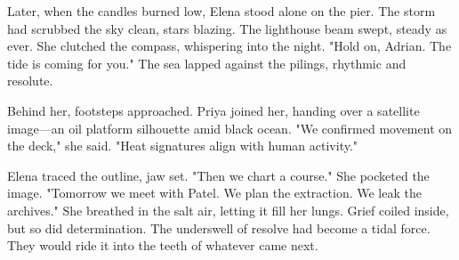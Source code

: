 Later, when the candles burned low, Elena stood alone on the pier. The storm had scrubbed the sky clean, stars blazing. The lighthouse beam swept, steady as ever. She clutched the compass, whispering into the night. "Hold on, Adrian. The tide is coming for you." The sea lapped against the pilings, rhythmic and resolute.

Behind her, footsteps approached. Priya joined her, handing over a satellite image—an oil platform silhouette amid black ocean. "We confirmed movement on the deck," she said. "Heat signatures align with human activity."

Elena traced the outline, jaw set. "Then we chart a course." She pocketed the image. "Tomorrow we meet with Patel. We plan the extraction. We leak the archives." She breathed in the salt air, letting it fill her lungs. Grief coiled inside, but so did determination. The underswell of resolve had become a tidal force. They would ride it into the teeth of whatever came next.

